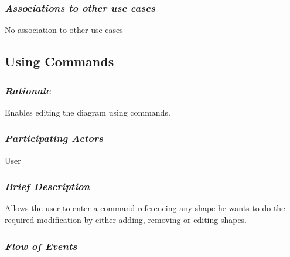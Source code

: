 \subsubsection {\em Associations to other use cases}
No association to other use-cases

\subsection{Using Commands}

\subsubsection {\em Rationale}
Enables editing the diagram using commands.

\subsubsection {\em Participating Actors}
User

\subsubsection {\em Brief Description}
Allows the user to enter a command referencing any shape he wants to do the required modification by either adding, removing or editing shapes.

\subsubsection {\em Flow of Events}

